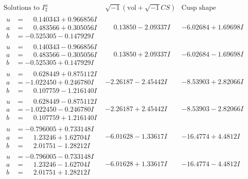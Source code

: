 \documentclass[1p]{elsarticle_modified}
\theoremstyle{definition}
\newcommand{\I}{\sqrt{-1}}
\begin{document}
$$\begin{array}{c|c|c}  
\text{Solutions to }I^u_{2}& \I (\text{vol} + \sqrt{-1}CS) & \text{Cusp shape}\\
 \hline 
\begin{aligned}
u &= \phantom{-}0.140343 + 0.966856 I \\
a &= \phantom{-}0.483566 + 0.305056 I \\
b &= -0.525305 - 0.147929 I\end{aligned}
 & \phantom{-}0.13850 - 2.09337 I & -6.02684 + 1.69698 I \\ \hline\begin{aligned}
u &= \phantom{-}0.140343 - 0.966856 I \\
a &= \phantom{-}0.483566 - 0.305056 I \\
b &= -0.525305 + 0.147929 I\end{aligned}
 & \phantom{-}0.13850 + 2.09337 I & -6.02684 - 1.69698 I \\ \hline\begin{aligned}
u &= \phantom{-}0.628449 + 0.875112 I \\
a &= -1.022450 + 0.246780 I \\
b &= \phantom{-}0.107759 - 1.216140 I\end{aligned}
 & -2.26187 - 2.45442 I & -8.53903 + 2.82066 I \\ \hline\begin{aligned}
u &= \phantom{-}0.628449 - 0.875112 I \\
a &= -1.022450 - 0.246780 I \\
b &= \phantom{-}0.107759 + 1.216140 I\end{aligned}
 & -2.26187 + 2.45442 I & -8.53903 - 2.82066 I \\ \hline\begin{aligned}
u &= -0.796005 + 0.733148 I \\
a &= \phantom{-}1.23246 + 1.62704 I \\
b &= \phantom{-}2.01751 - 1.28212 I\end{aligned}
 & -6.01628 - 1.33617 I & -16.4774 + 4.4812 I \\ \hline\begin{aligned}
u &= -0.796005 - 0.733148 I \\
a &= \phantom{-}1.23246 - 1.62704 I \\
b &= \phantom{-}2.01751 + 1.28212 I\end{aligned}
 & -6.01628 + 1.33617 I & -16.4774 - 4.4812 I \\ \hline\begin{aligned}

\end{aligned}
\end{array}$$
\end{document}
